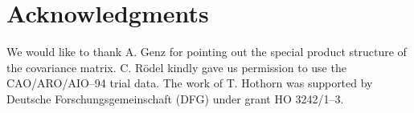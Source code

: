 \section*{Acknowledgments}

We would like to thank A. Genz for pointing out the special
product structure of the covariance matrix. C. R\"odel
kindly gave us permission to use the CAO/ARO/AIO--94 trial data.
The work of T. Hothorn was supported by Deutsche Forschungsgemeinschaft (DFG) 
under grant HO 3242/1--3.
